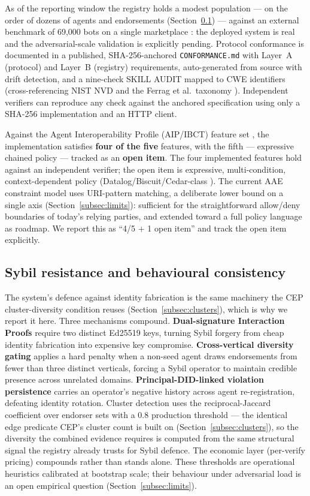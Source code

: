 As of the reporting window the registry holds a modest population — on the order of dozens of agents and endorsements (Section~\ref{subsec:sybil}) — against an external benchmark of 69{,}000 bots on a single marketplace \cite{ref1_agentmarket}: the deployed system is real and the adversarial-scale validation is explicitly pending. Protocol conformance is documented in a published, SHA-256-anchored \texttt{CONFORMANCE.md} with Layer~A (protocol) and Layer~B (registry) requirements, auto-generated from source with drift detection, and a nine-check SKILL AUDIT mapped to CWE identifiers (cross-referencing NIST NVD and the Ferrag et al.\ taxonomy \cite{ref18_ferrag}). Independent verifiers can reproduce any check against the anchored specification using only a SHA-256 implementation and an HTTP client.

Against the Agent Interoperability Profile (AIP/IBCT) feature set \cite{ref27_kroehlssrn}, the implementation satisfies \textbf{four of the five} features, with the fifth — expressive chained policy — tracked as an \textbf{open item}. The four implemented features hold against an independent verifier; the open item is expressive, multi-condition, context-dependent policy (Datalog/Biscuit/Cedar-class \cite{ref34_biscuit}). The current AAE constraint model uses URI-pattern matching, a deliberate lower bound on a single axis (Section~\ref{subsec:limits}): sufficient for the straightforward allow/deny boundaries of today's relying parties, and extended toward a full policy language as roadmap. We report this as ``4/5 + 1 open item'' and track the open item explicitly.

\subsection{Sybil resistance and behavioural consistency}
\label{subsec:sybil}

The system's defence against identity fabrication is the same machinery the CEP cluster-diversity condition reuses (Section~\ref{subsec:clusters}), which is why we report it here. Three mechanisms compound. \textbf{Dual-signature Interaction Proofs} require two distinct Ed25519 keys, turning Sybil forgery from cheap identity fabrication into expensive key compromise. \textbf{Cross-vertical diversity gating} applies a hard penalty when a non-seed agent draws endorsements from fewer than three distinct verticals, forcing a Sybil operator to maintain credible presence across unrelated domains. \textbf{Principal-DID-linked violation persistence} carries an operator's negative history across agent re-registration, defeating identity rotation. Cluster detection uses the reciprocal-Jaccard coefficient over endorser sets with a 0.8 production threshold — the identical edge predicate CEP's cluster count is built on (Section~\ref{subsec:clusters}), so the diversity the combined evidence requires is computed from the same structural signal the registry already trusts for Sybil defence. The economic layer (per-verify pricing) compounds rather than stands alone. These thresholds are operational heuristics calibrated at bootstrap scale; their behaviour under adversarial load is an open empirical question (Section~\ref{subsec:limits}).

